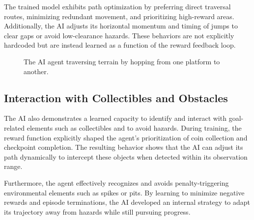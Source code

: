 \documentclass[12pt,oneside,openright,a4paper]{cpe-english-project}
\begin{document}
The trained model exhibits path optimization by preferring direct traversal routes, minimizing redundant movement, and prioritizing high-reward areas. Additionally, the AI adjusts its horizontal momentum and timing of jumps to clear gaps or avoid low-clearance hazards. These behaviors are not explicitly hardcoded but are instead learned as a function of the reward feedback loop.

\begin{figure}[H]
\centering
{}
\caption{The AI agent traversing terrain by hopping from one platform to another.}
\label{fig:AIJump}
\end{figure}

\subsection{Interaction with Collectibles and Obstacles}

The AI also demonstrates a learned capacity to identify and interact with goal-related elements such as collectibles and to avoid hazards. During training, the reward function explicitly shaped the agent's prioritization of coin collection and checkpoint completion. The resulting behavior shows that the AI can adjust its path dynamically to intercept these objects when detected within its observation range.

Furthermore, the agent effectively recognizes and avoids penalty-triggering environmental elements such as spikes or pits. By learning to minimize negative rewards and episode terminations, the AI developed an internal strategy to adapt its trajectory away from hazards while still pursuing progress.
\end{document}
